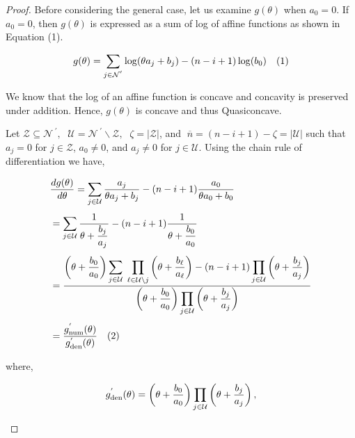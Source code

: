 \documentclass[letterpaper]{article} %
\theoremstyle{definition}
\begin{document}
\begin{proof}
\noindent Before considering the general case, let us examine $g(\theta)$ when $a_{0} = 0$. If $a_{0} = 0$, then $g(\theta)$ is expressed as a sum of log of affine functions as shown in Equation (1).
\begin{linenomath}
\begin{equation*}
g(\theta) = \displaystyle \sum_{j \in \mathcal{N}^{'}} \log(\theta a_{j} + b_{j}) - (n-i+1) \log(b_{0}) \quad \textnormal{(1)} 
\end{equation*}
\end{linenomath}

\noindent We know that the log of an affine function is concave and concavity is preserved under addition. Hence, $g(\theta)$ is concave and thus Quasiconcave.

\noindent Let $\mathcal{Z} \subseteq \mathcal{N}^{\;'}, \;$ $\mathcal{U} = \mathcal{N}^{\;'} \backslash \mathcal{Z}, \;$ $\zeta = |{\mathcal{Z}}|$, and $\;\overline{n} = (n - i + 1) - \zeta = |\mathcal{U}|$ such that $a_{j} = 0$ for $j \in \mathcal{Z}$, $a_{0} \neq 0$, and $a_{j} \neq 0$ for $j \in \mathcal{U}$. Using the chain rule of differentiation we have,
\begin{linenomath}
\begin{equation*}
\begin{split}
& \frac{d g(\theta)}{d \theta} = \displaystyle \sum_{j \in \mathcal{U}} \displaystyle \frac{a_{j}}{\theta a_{j} + b_{j}} - (n - i + 1) \displaystyle \frac{a_{0}}{\theta a_{0} + b_{0}} 
\\[4 pt] & = \displaystyle \sum_{j \in \mathcal{U}} \displaystyle \frac{1}{\theta + \displaystyle \frac{b_{j}}{a_{j}}} - (n - i + 1) \displaystyle \frac{1}{\theta + \displaystyle \frac{b_{0}}{a_{0}}}
\\[4 pt] & = \displaystyle \frac{\left(\theta + \displaystyle \frac{b_{0}}{a_{0}} \right) \displaystyle \sum_{j \in \mathcal{U}} \;\displaystyle \prod_{\ell \in \mathcal{U} \backslash j} \left( \theta + \frac{b_{\ell}}{a_{\ell}}\right) - (n - i + 1) \prod_{j \in \mathcal{U}} \left(\theta + \displaystyle \frac{b_{j}}{a_{j}} \right) }{\left( \theta + \displaystyle \frac{b_{0}}{a_{0}} \right) \displaystyle \prod_{j \in \mathcal{U}} \left(\theta + \displaystyle \frac{b_{j}}{a_{j}} \right)}
\\[4 pt] & = \displaystyle \frac{g^{'}_{\textnormal{num}}(\theta)}{g^{'}_{\textnormal{den}}(\theta)} \quad \textnormal{(2)}
\end{split}
\end{equation*}
\end{linenomath}
\noindent where,
\begin{linenomath}
\begin{equation*}
g^{'}_{\textnormal{den}}(\theta) = \left( \theta + \displaystyle \frac{b_{0}}{a_{0}} \right) \displaystyle \prod_{j \in \mathcal{U}} \left(\theta + \displaystyle \frac{b_{j}}{a_{j}} \right),
\end{equation*}
\end{linenomath}


\end{proof}
\end{document}
